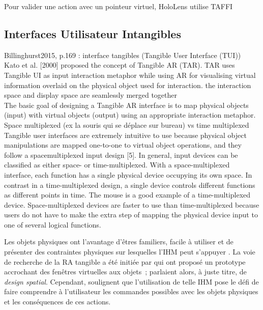 
Pour valider une action avec un pointeur virtuel, HoloLens utilise TAFFI \cite{Wilson2006}

\subsection{Interfaces Utilisateur Intangibles}
\label{subsec:litterature_ar_hci_tui}
Billinghurst2015, p.169 : interface tangibles (Tangible User Interface (TUI))\\
Kato et al. [2000] proposed the concept of Tangible AR (TAR). TAR uses Tangible UI as input interaction metaphor while using AR for visualising virtual information overlaid on the physical object used for interaction. the interaction space and display space are seamlessly merged together\\
The basic goal of designing a Tangible AR interface is to map physical objects (input) with virtual objects (output) using an appropriate interaction metaphor.\\
Space multiplexed (ex la souris qui se déplace sur bureau) vs time multiplexed
Tangible user interfaces are extremely intuitive to use because physical object manipulations are mapped one-to-one to virtual
object operations, and they follow a spacemultiplexed input design [5]. In general, input devices can be classified as either space- or time-multiplexed. With a space-multiplexed interface, each function has a single physical device occupying its own space. In contrast in a time-multiplexed design, a single device controls different functions as different points in time. The mouse is a good example of a time-multiplexed device. Space-multiplexed devices are faster to use than time-multiplexed because users do not have to make the extra step of mapping the physical device input to one of several logical functions. \cite{Billinghurst2005}

Les objets physiques ont l'avantage d'êtres familiers, facile à utiliser et de présenter des contraintes physiques sur lesquelles l'IHM peut s'appuyer \citep{ZhouDuhBillinghurst2008}. La voie de recherche de la RA tangible a été initiée par \cite{FeinerMacIntyreHauptEtAl1993} qui ont proposé un prototype accrochant des fenêtres virtuelles aux objets~; \citeauthor{FeinerMacIntyreHauptEtAl1993} parlaient alors, à juste titre, de \emph{design spatial}. Cependant, \citeauthor{ZhouDuhBillinghurst2008} soulignent que l'utilisation de telle IHM pose le défi de faire comprendre à l'utilisateur les commandes possibles avec les objets physiques et les conséquences de ces actions.

